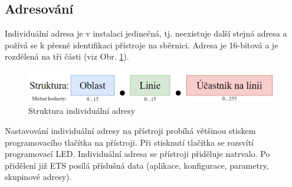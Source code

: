 \subsection{Adresování}
\label{Adresování}
Individuální adresa je v instalaci jedinečná, tj. neexistuje další stejná adresa a požívá se k přesné identifikaci přístroje na sběrnici. Adresa je 16-bitová a je rozdělená na tři části (viz Obr. \ref{fig:Struktura individuální adresy]}).
\begin{figure}[!h]
  \begin{center}
    \includegraphics[scale=0.6]{obrazky/Adresovani.png}
  \end{center}
  \caption[Struktura individuální adresy \cite{Celkovy prehled)}]{Struktura individuální adresy \cite{Celkovy prehled}}
  \label{fig:Struktura individuální adresy]}
\end{figure}

Nastavování individuální adresy na přístroji probíhá většinou stiskem programovacího tlačítka na přístroji. Při stisknutí tlačítka se rozsvítí programovací LED. Individuální adresa se přístroji přiděluje natrvalo. Po přidělení již ETS posílá příslušná data (aplikace, konfigurace, parametry, skupinové adresy).

